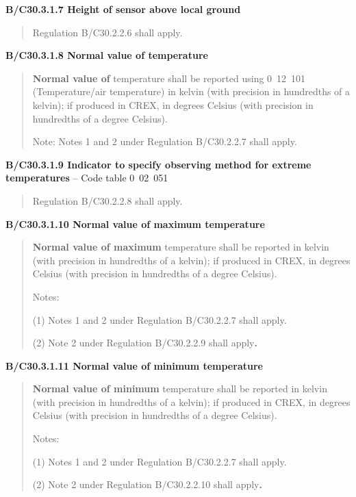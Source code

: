 \textbf{B/C30.3.1.7 Height of sensor above local ground}

\begin{quote}
Regulation B/C30.2.2.6 shall apply.
\end{quote}

\textbf{B/C30.3.1.8 Normal value of temperature}

\begin{quote}
\textbf{Normal value of} temperature shall be reported using 0~12~101 (Temperature/air temperature) in kelvin (with precision in hundredths of a kelvin); if produced in CREX, in degrees Celsius (with precision in hundredths of a degree Celsius).

Note: Notes 1 and 2 under Regulation B/C30.2.2.7 shall apply.
\end{quote}

\textbf{B/C30.3.1.9 Indicator to specify observing method for extreme temperatures} -- Code table 0~02~051

\begin{quote}
Regulation B/C30.2.2.8 shall apply.
\end{quote}

\textbf{B/C30.3.1.10 Normal value of maximum temperature}

\begin{quote}
\textbf{Normal value of maximum} temperature shall be reported in kelvin (with precision in hundredths of a kelvin); if produced in CREX, in degrees Celsius (with precision in hundredths of a degree Celsius).

Notes:

(1) Notes 1 and 2 under Regulation B/C30.2.2.7 shall apply.

(2) Note 2 under Regulation B/C30.2.2.9 shall apply\textbf{.}
\end{quote}

\textbf{B/C30.3.1.11 Normal value of minimum temperature}

\begin{quote}
\textbf{Normal value of minimum} temperature shall be reported in kelvin (with precision in hundredths of a kelvin); if produced in CREX, in degrees Celsius (with precision in hundredths of a degree Celsius).

Notes:

(1) Notes 1 and 2 under Regulation B/C30.2.2.7 shall apply.

(2) Note 2 under Regulation B/C30.2.2.10 shall apply\textbf{.}
\end{quote}

